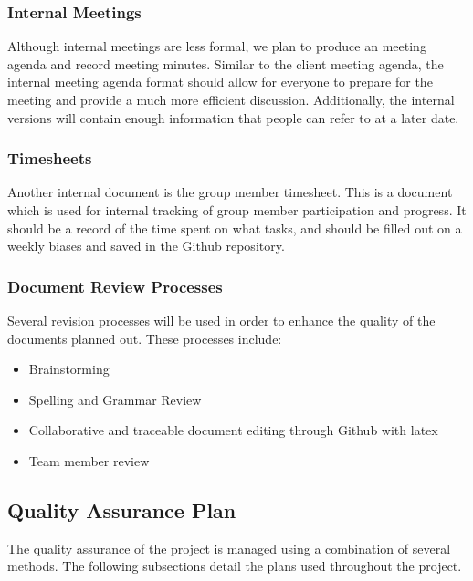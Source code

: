 \subsubsection{Internal Meetings}
Although internal meetings are less formal, we plan to produce an meeting agenda and record meeting minutes. Similar to the client meeting agenda, the internal meeting agenda format should allow for everyone to prepare for the meeting and provide a much more efficient discussion. Additionally, the internal versions will contain enough information that people can refer to at a later date.

\subsubsection{Timesheets}
Another internal document is the group member timesheet. This is a document which is used for internal tracking of group member participation and progress. It should be a record of the time spent on what tasks, and should be filled out on a weekly biases and saved in the Github repository.

\subsubsection{Document Review Processes}
Several revision processes will be used in order to enhance the quality of the documents planned out. These processes include:

\begin{itemize}
\item Brainstorming
\item Spelling and Grammar Review
\item Collaborative and traceable document editing through Github with latex
\item Team member review
\end{itemize}



\subsection{Quality Assurance Plan}
The quality assurance of the project is managed using a combination of several methods. The following subsections detail the plans used throughout the project.

